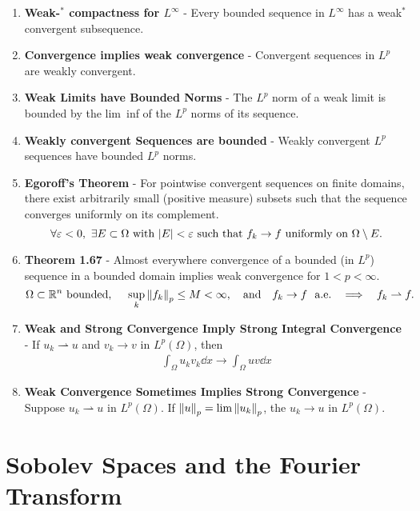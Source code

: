 \documentclass{article}
\newcommand{\E}{\varepsilon}
\newcommand{\Rl}{\mathbb{R}}
\begin{document}
\begin{enumerate}
        \item
            \textbf{Weak-$^*$ compactness for $L^\infty$} - Every bounded sequence in $L^\infty$ has a weak$^*$ convergent subsequence.
        \item
            \textbf{Convergence implies weak convergence} - Convergent sequences in $L^p$ are weakly convergent.
        \item
            \textbf{Weak Limits have Bounded Norms} - The $L^p$ norm of a weak limit is bounded by the lim~inf of the $L^p$ norms of its sequence.
        \item
            \textbf{Weakly convergent Sequences are bounded} - Weakly convergent $L^p$ sequences have bounded $L^p$ norms.
        \item
            \textbf{Egoroff's Theorem} - For pointwise convergent sequences on finite domains, there exist arbitrarily small (positive measure) subsets such that the sequence converges uniformly on its complement. $$\forall \E < 0,\ \exists E \subset \Omega\ \text{with}\ \abs{E} < \E\ \text{such that}\ f_k \rightarrow f\ \text{uniformly on}\ \Omega\setminus E.$$
        \item
            \textbf{Theorem 1.67} - Almost everywhere convergence of a bounded (in $L^p$) sequence in a bounded domain implies weak convergence for $1 < p < \infty$. $$\Omega \subset \Rl^n\ \text{bounded},\ \ \ \ \sup_{k}\norm{f_k}_p \leq M < \infty,\ \ \ \text{and}\ \ \ f_k \rightarrow f\ \text{ a.e.}\ \ \implies\ \ f_k \rightharpoonup f.$$
        \item
            \textbf{Weak and Strong Convergence Imply Strong Integral Convergence} - If $u_k \rightharpoonup u$ and $v_k \rightarrow v$ in $L^p(\Omega)$, then
            \begin{align*}
                \int_\Omega u_kv_k \dd x \rightarrow \int_\Omega uv \dd x
            \end{align*}
        \item
            \textbf{Weak Convergence Sometimes Implies Strong Convergence} - Suppose $u_k \rightharpoonup u$ in $L^p(\Omega)$.  If $\norm{u}_p = \lim\norm{u_k}_p$, the $u_k \rightarrow u$ in $L^p(\Omega)$.
    \end{enumerate}

    \section{Sobolev Spaces and the Fourier Transform}
\end{document}
